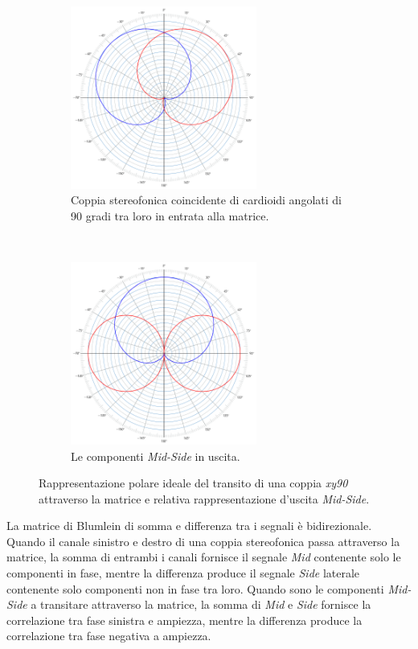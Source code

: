 \begin{figure}[b!]
    \centering
    \begin{subfigure}[t]{0.48\textwidth}
        \centering
        \includegraphics[height=6cm]{CAPITOLI/_TIKZ/POLAR/xy90}
        \caption{Coppia stereofonica coincidente di cardioidi angolati di 90 gradi tra loro in entrata alla matrice.}%
        \label{pol:xy90ms}
    \end{subfigure}%
    ~
    \begin{subfigure}[t]{0.48\textwidth}
        \centering
        \includegraphics[height=6cm]{CAPITOLI/_TIKZ/POLAR/midside}
        \caption{Le componenti \emph{Mid-Side} in uscita.}%
        \label{pol:midsidems}
    \end{subfigure}
    \caption{Rappresentazione polare ideale del transito di una coppia \emph{xy90}
    attraverso la matrice e relativa rappresentazione d'uscita \emph{Mid-Side}.}
    \label{pol:msmatrix}
\end{figure}

La matrice di Blumlein di somma e differenza tra i segnali è bidirezionale.
Quando il canale sinistro e destro di una coppia stereofonica passa attraverso la
matrice, la somma di entrambi i canali fornisce il segnale \emph{Mid} contenente solo le componenti in fase,
mentre la differenza produce il segnale \emph{Side} laterale contenente solo
componenti non in fase tra loro. Quando sono le componenti \emph{Mid-Side} a transitare
attraverso la matrice, la somma di \emph{Mid} e \emph{Side} fornisce la
correlazione tra fase sinistra e ampiezza, mentre la differenza produce la
correlazione tra fase negativa a ampiezza.

